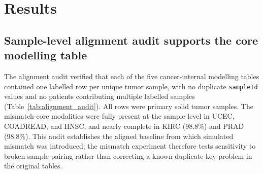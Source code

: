 \section{Results}

\subsection{Sample-level alignment audit supports the core modelling table}

The alignment audit verified that each of the five cancer-internal modelling tables contained one labelled row per unique tumor sample, with no duplicate \texttt{sampleId} values and no patients contributing multiple labelled samples (Table~\ref{tab:alignment_audit}). All rows were primary solid tumor samples. The mismatch-core modalities were fully present at the sample level in UCEC, COADREAD, and HNSC, and nearly complete in KIRC (98.8\%) and PRAD (98.8\%). This audit establishes the aligned baseline from which simulated mismatch was introduced; the mismatch experiment therefore tests sensitivity to broken sample pairing rather than correcting a known duplicate-key problem in the original tables.

\begin{table}[ht]
\centering
\caption{Sample-level alignment audit for the five cancer-internal tasks. Core completeness refers to rows with at least one observed feature in mRNA, GISTIC copy number, methylation, and mutation. RPPA is shown as sample-level presence of any RPPA feature and is distinct from feature-level sparsity.}
\label{tab:alignment_audit}
\end{table}

